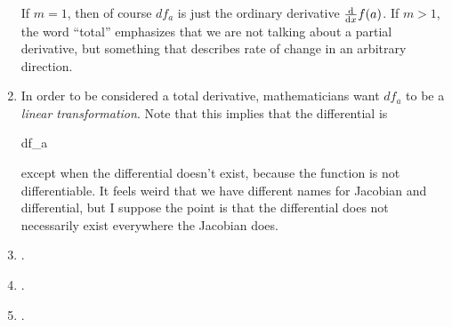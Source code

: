 \documentclass[11pt, oneside]{amsart}
\begin{document}
\begin{enumerate}
\noindent
If $m=1$, then of course $df_a$ is just the ordinary derivative
$\frac{ \mathop{\mathrm{d}} }{ \mathop{\mathrm{d}x} } f\mathopen{}\left( {a} \right)\mathclose{}$. If $m > 1$, the word ``total'' emphasizes that we
are not talking about a partial derivative, but something that describes
rate of change in an arbitrary direction.

\item In order to be considered a total derivative, mathematicians want
$df_a$ to be a \emph{linear transformation}. Note that this implies that
the differential is

\begin{nedqn}
  df_a
\eqcol
  \mJ{}
\end{nedqn}

\noindent
except when the differential doesn't exist, because the function is not
differentiable. It feels weird that we have different names for Jacobian
and differential, but I suppose the point is that the differential does
not necessarily exist everywhere the Jacobian does.

\item {}.
\item {}.
\item {}.

\end{enumerate}
\end{document}
